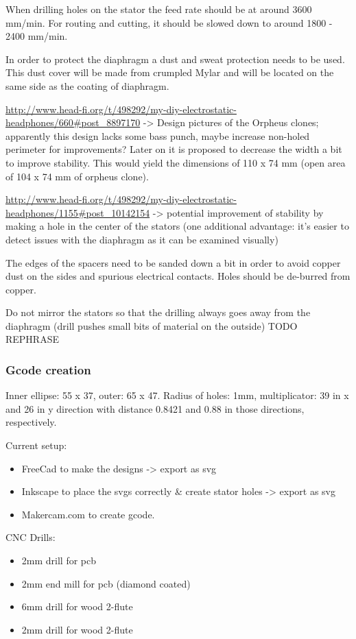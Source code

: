 \documentclass{article}
\begin{document}
When drilling holes on the stator the feed rate should be at around 3600 mm/min.  For routing and cutting, it should be slowed down to around 1800 - 2400 mm/min.

In order to protect the diaphragm a dust and sweat protection needs to be used. This dust cover will be made from crumpled Mylar and will be located on the same side as the coating of diaphragm.

\url{http://www.head-fi.org/t/498292/my-diy-electrostatic-headphones/660#post_8897170} -> Design pictures of the Orpheus clones; apparently this design lacks some bass punch, maybe increase non-holed perimeter for improvements? Later on it is proposed to decrease the width a bit to improve stability. This would yield the dimensions of 110 x 74 mm (open area of 104 x 74 mm of orpheus clone).

\url{http://www.head-fi.org/t/498292/my-diy-electrostatic-headphones/1155#post_10142154} -> potential improvement of stability by making a hole in the center of the stators (one additional advantage: it's easier to detect issues with the diaphragm as it can be examined visually)

The edges of the spacers need to be sanded down a bit in order to avoid copper dust on the sides and spurious electrical contacts. Holes should be de-burred from copper.

Do not mirror the stators so that the drilling always goes away from the diaphragm (drill pushes small bits of material on the outside) TODO REPHRASE

\subsubsection{Gcode creation}
\label{s:driver:design:gcode}
Inner ellipse: 55 x 37, outer: 65 x 47. Radius of holes: 1mm, multiplicator: 39 in x and 26 in y direction with distance 0.8421 and 0.88 in those directions, respectively.

Current setup:

\begin{itemize}
    \item FreeCad to make the designs -> export as svg
    \item Inkscape to place the svgs correctly \& create stator holes -> export as svg
    \item Makercam.com to create gcode.
\end{itemize}

CNC Drills:

\begin{itemize}
    \item 2mm drill for pcb
    \item 2mm end mill for pcb (diamond coated)
    \item 6mm drill for wood 2-flute
    \item 2mm drill for wood 2-flute
\end{itemize}
\end{document}
